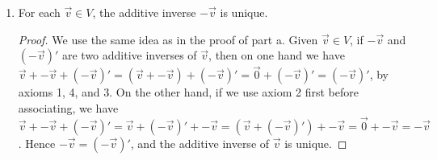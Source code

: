 \documentclass[11pt,fleqn]{book} %
\begin{document}
\begin{proposition}
\begin{enumerate}[label=\alph*)]
\begin{proof}
            Pick $\overrightarrow{v} \in V$. 
            \begin{align*}
                \underset{\mathbb{F}}{0}\overrightarrow{v} 
                &= (\underset{\mathbb{F}}{0} + \underset{\mathbb{F}}{0})\overrightarrow{v} 
                \\
                &= \underset{\mathbb{F}}{0}\overrightarrow{v} + \underset{\mathbb{F}}{0}\overrightarrow{v}
                \\
                (-\underset{\mathbb{F}}{0}\overrightarrow{v}) + \underset{\mathbb{F}}{0}\overrightarrow{v}
                &= (-\underset{\mathbb{F}}{0}\overrightarrow{v}) + (\underset{\mathbb{F}}{0}\overrightarrow{v} + \underset{\mathbb{F}}{0}\overrightarrow{v})
                \\
                -\underset{\mathbb{F}}{0}\overrightarrow{v} + \underset{\mathbb{F}}{0}\overrightarrow{v}
                &= (-\underset{\mathbb{F}}{0}\overrightarrow{v} + \underset{\mathbb{F}}{0}\overrightarrow{v}) + \underset{\mathbb{F}}{0}\overrightarrow{v}
                \\
                \overrightarrow{0_V}
                &=
                \overrightarrow{0_V} + \underset{\mathbb{F}}{0}\overrightarrow{v}
                \\
                &=\underset{\mathbb{F}}{0}\overrightarrow{v}
            \end{align*}
            
            Thus, $\forall \overrightarrow{v} \in V$, $\underset{\mathbb{F}}{0}\overrightarrow{v} = \overrightarrow{0_V}$. 
        \end{proof}

        \item For each $\overrightarrow{v} \in V$, the additive inverse $-\overrightarrow{v}$ is unique.

        \begin{proof}
            We use the same idea as in the proof of part a. Given $\overrightarrow{v} \in V$, if $-\overrightarrow{v}$ and $(-\overrightarrow{v})'$ are two additive inverses of $\overrightarrow{v}$, then on one hand we have $\overrightarrow{v} + -\overrightarrow{v}  + (-\overrightarrow{v})' = (\overrightarrow{v} + -\overrightarrow{v}) + (-\overrightarrow{v})' = \overrightarrow{0} + (-\overrightarrow{v})' = (-\overrightarrow{v})'$, by axioms 1, 4, and 3. On the other hand, if we use axiom 2 first before associating, we have $\overrightarrow{v} + -\overrightarrow{v}  + (-\overrightarrow{v})' = \overrightarrow{v} + (-\overrightarrow{v})' + -\overrightarrow{v} = (\overrightarrow{v} + (-\overrightarrow{v})') + -\overrightarrow{v} = \overrightarrow{0} + -\overrightarrow{v} = -\overrightarrow{v}$. Hence $-\overrightarrow{v} = (-\overrightarrow{v})'$, and the additive inverse of $\overrightarrow{v}$ is unique.
        \end{proof}
        

\end{enumerate}
\end{proposition}
\end{document}
